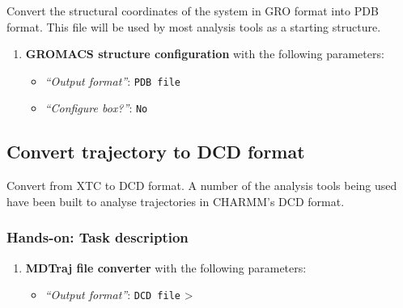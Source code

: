 \documentclass[twocolumn]{bmcart}%
\providecommand{\tightlist}{%
  \setlength{\itemsep}{0pt}\setlength{\parskip}{0pt}}
\providecommand{\tightlist}{%
  \setlength{\itemsep}{0pt}\setlength{\parskip}{0pt}}
\begin{document}
Convert the structural coordinates of the system in GRO format into PDB
format. This file will be used by most analysis tools as a starting structure.

\begin{handson_box_colour}


\begin{enumerate}
\def\labelenumi{\arabic{enumi}.}
\tightlist
\item
  \textbf{GROMACS structure configuration} with the following
  parameters:

  \begin{itemize}
  \tightlist
  \item
    \emph{``Output format''}: \texttt{PDB\ file}
  \item
    \emph{``Configure box?''}: \texttt{No}
  \end{itemize}
\end{enumerate}


\end{handson_box_colour}

\hypertarget{convert-trajectory-to-dcd-format}{%
\subsection*{Convert trajectory to DCD
format}\label{convert-trajectory-to-dcd-format}}

Convert from XTC to DCD format. A number of the analysis tools being
used have been built to analyse trajectories in CHARMM's DCD format.

\begin{handson_box_colour}


\hypertarget{hands-on-task-description-8}{%
\subsubsection{Hands-on: Task
description}\label{hands-on-task-description-8}}

\begin{enumerate}
\def\labelenumi{\arabic{enumi}.}
\tightlist
\item
  \textbf{MDTraj file converter} with the following parameters:

  \begin{itemize}
  \tightlist
  \item
    \emph{``Output format''}: \texttt{DCD\ file} \textgreater{}
  \end{itemize}
\end{enumerate}

\end{handson_box_colour}
\end{document}
